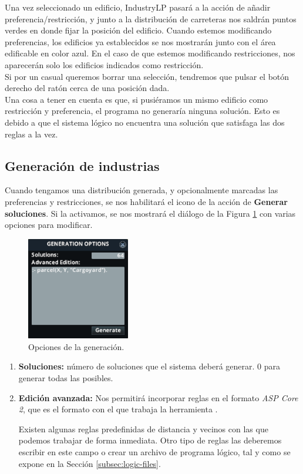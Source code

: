 Una vez seleccionado un edificio, IndustryLP pasará a la acción de añadir preferencia/restricción, y junto a la distribución de carreteras nos saldrán puntos verdes en donde fijar la posición del edificio. Cuando estemos modificando preferencias, los edificios ya establecidos se nos mostrarán junto con el área edificable en color azul. En el caso de que estemos modificando restricciones, nos aparecerán solo los edificios indicados como restricción. \\

Si por un casual queremos borrar una selección, tendremos que pulsar el botón derecho del ratón cerca de una posición dada. \\

Una cosa a tener en cuenta es que, si pusiéramos un mismo edificio como restricción y preferencia, el programa no generaría ninguna solución. Esto es debido a que el sistema lógico no encuentra una solución que satisfaga las dos reglas a la vez.

\subsection{Generación de industrias}

Cuando tengamos una distribución generada, y opcionalmente marcadas las preferencias y restricciones, se nos habilitará el icono de la acción de \textbf{Generar soluciones}. Si la activamos, se nos mostrará el diálogo de la Figura \ref{fig:dialog} con varias opciones para modificar.

\begin{figure}[h]
	\centering
	\includegraphics[width=0.4\textwidth]{images/dialog}
	\caption{Opciones de la generación.}
	\label{fig:dialog}
\end{figure}

\begin{enumerate}
    \item \textbf{Soluciones:} número de soluciones que el sistema deberá generar. 0 para generar todas las posibles.
    \item \textbf{Edición avanzada:} Nos permitirá incorporar reglas en el formato \textit{ASP Core 2}, que es el formato con el que trabaja la herramienta \clingo.
    
    Existen algunas reglas predefinidas de distancia y vecinos con las que podemos trabajar de forma inmediata. Otro tipo de reglas las deberemos escribir en este campo o crear un archivo de programa lógico, tal y como se expone en la Sección \ref{subsec:logic-files}.
\end{enumerate}

